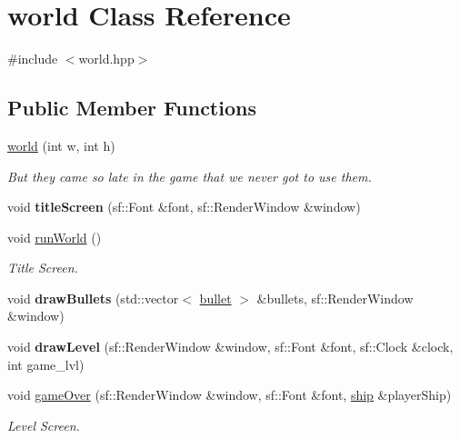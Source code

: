\hypertarget{classworld}{}\section{world Class Reference}
\label{classworld}


{\ttfamily \#include $<$world.\+hpp$>$}

\subsection*{Public Member Functions}
\begin{DoxyCompactItemize}
\item 
\mbox{\label{classworld_a9323d6e3a76a737bd68b50e1dd882ef0}} 
\hyperlink{classworld_a9323d6e3a76a737bd68b50e1dd882ef0}{world} (int w, int h)
\begin{DoxyCompactList}\small\item\em But they came so late in the game that we never got to use them. \end{DoxyCompactList}\item 
\mbox{\label{classworld_aef44ec20faffebd16882f6d6826f70a4}} 
void {\bfseries title\+Screen} (sf\+::\+Font \&font, sf\+::\+Render\+Window \&window)
\item 
void \hyperlink{classworld_a5347c4a6636fec585a64e3c730dd0e5b}{run\+World} ()
\begin{DoxyCompactList}\small\item\em Title Screen. \end{DoxyCompactList}\item 
\mbox{\label{classworld_ac4ac23ad57a8283d21943859b10d7d05}} 
void {\bfseries draw\+Bullets} (std\+::vector$<$ \hyperlink{classbullet}{bullet} $>$ \&bullets, sf\+::\+Render\+Window \&window)
\item 
\mbox{\label{classworld_a8e89f67a37a68388e5ac5c25b608636f}} 
void {\bfseries draw\+Level} (sf\+::\+Render\+Window \&window, sf\+::\+Font \&font, sf\+::\+Clock \&clock, int game\+\_\+lvl)
\item 
\mbox{\label{classworld_a356b5774daf6a2175d8aebdc7096262e}} 
void \hyperlink{classworld_a356b5774daf6a2175d8aebdc7096262e}{game\+Over} (sf\+::\+Render\+Window \&window, sf\+::\+Font \&font, \hyperlink{classship}{ship} \&player\+Ship)
\begin{DoxyCompactList}\small\item\em Level Screen. \end{DoxyCompactList}\end{DoxyCompactItemize}
